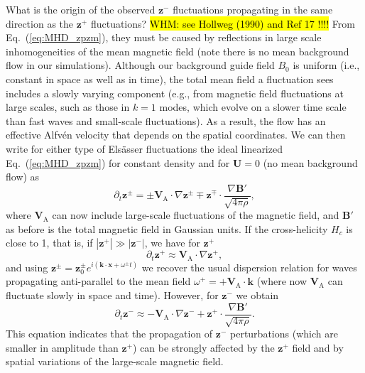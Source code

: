 \documentclass[aip,pop,reprint,amsmath,amssymb,floatfix]{revtex4-1}
\def\WHM#1{{\hl{WHM: #1}}}
\renewcommand{\vec}[1]{\mathbf{#1}}
\begin{document}
What is the origin of the observed $\vec{z}^-$ fluctuations propagating in the same direction as the $\vec{z}^+$ fluctuations? \WHM{see Hollweg (1990) and Ref 17 !!!!} From Eq.~(\ref{eq:MHD_zpzm}), they must be caused by reflections in large scale inhomogeneities of the mean magnetic field (note there is no mean background flow in our simulations). Although our background guide field $B_0$ is uniform (i.e., constant in space as well as in time), the total mean field a fluctuation sees includes a slowly varying component (e.g., from magnetic field fluctuations at large scales, such as those in $k=1$ modes, which evolve on a slower time scale than fast waves and small-scale fluctuations). As a result, the flow has an effective Alfv\'en velocity that depends on the spatial coordinates. We can then write for either type of Els\"asser fluctuations the ideal linearized Eq.~(\ref{eq:MHD_zpzm}) for constant density and for $\vec{U}=0$ (no mean background flow) as
\begin{equation}
\partial_t \vec{z}^\pm = \pm \vec{V}_\textrm{A} \cdot \nabla \vec{z}^\pm 
    \mp \vec{z}^\mp \cdot \frac{\nabla \vec{B}'}{\sqrt{4\pi \rho}} ,
\end{equation}
where $\vec{V}_\textrm{A}$ can now include large-scale fluctuations of the magnetic field, and $\vec{B}'$ as before is the total magnetic field in Gaussian units. If the cross-helicity $H_c$ is close to 1, that is, if $|\vec{z}^+| \gg |\vec{z}^-|$, we have for $\vec{z}^+$
\begin{equation}
\partial_t \vec{z}^+  \approx \vec{V}_\textrm{A} \cdot \nabla \vec{z}^+ ,
\end{equation}
and using $\vec{z}^\pm = \vec{z}_0^\pm e^{i(\vec{k}\cdot \vec{x}+\omega^\pm t)}$ we recover the usual dispersion relation for waves propagating anti-parallel to the mean field $\omega^+ = +\vec{V}_\textrm{A} \cdot \vec{k}$ (where now $\vec{V}_\textrm{A}$ can fluctuate slowly in space and time). However, for $\vec{z}^-$ we obtain
\begin{equation}
\partial_t \vec{z}^- \approx - \vec{V}_\textrm{A} \cdot \nabla \vec{z}^- + \vec{z}^+ 
    \cdot \frac{\nabla \vec{B}'}{\sqrt{4\pi \rho}} .
\label{eq:zmlinear}
\end{equation}
This equation indicates that the propagation of $\vec{z}^-$ perturbations (which are smaller in amplitude than $\vec{z}^+$) can be strongly affected by the $\vec{z}^+$ field and by spatial variations of the large-scale magnetic field.
\end{document}
